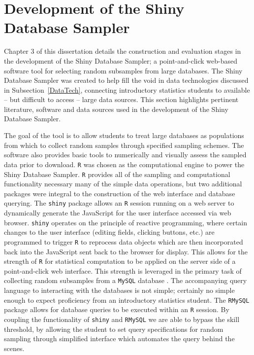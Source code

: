 \section{Development of the Shiny Database Sampler}
\label{ShinyDBSamplerLit}

Chapter 3 of this dissertation details the construction and evaluation stages in the development of the Shiny Database Sampler; a point-and-click web-based software tool for selecting random subsamples from large databases. The Shiny Database Sampler was created to help fill the void in data technologies discussed in Subsection~\ref{DataTech}, connecting introductory statistics students to available -- but difficult to access -- large data sources. This section highlights pertinent literature, software and data sources used in the development of the Shiny Database Sampler.

The goal of the tool is to allow students to treat large databases as populations from which to collect random samples through specified sampling schemes. The software also provides basic tools to numerically and visually assess the sampled data prior to download. \texttt{R} \citep{R} was chosen as the computational engine to power the Shiny Database Sampler. \texttt{R} provides all of the sampling and computational functionality necessary many of the simple data operations, but two additional packages were integral to the construction of the web interface and database querying. The \texttt{shiny} package \citep{shiny} allows an \texttt{R} session running on a web server to dynamically generate the JavaScript for the user interface accessed via web browser. \texttt{shiny} operates on the principle of reactive programming, where certain changes to the user interface (editing fields, clicking buttons, etc.) are programmed to trigger \texttt{R} to reprocess data objects which are then incorporated back into the JavaScript sent back to the browser for display. This allows for the strength of \texttt{R} for statistical computation to be applied on the server side of a point-and-click web interface. This strength is leveraged in the primary task of collecting random subsamples from a \texttt{MySQL} database \citep{MySQL}. The accompanying query language to interacting with the databases is not simple; certainly no simple enough to expect proficiency from an introductory statistics student. The \texttt{RMySQL} package \citep{RMySQL} allows for database queries to be executed within an \texttt{R} session. By coupling the functionality of \texttt{shiny} and \texttt{RMySQL} we are able to bypass the skill threshold, by allowing the student to set query specifications for random sampling through simplified interface which automates the query behind the scenes. 


